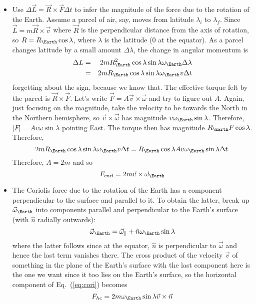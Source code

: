 \documentclass[11pt]{book}
\def\be{\begin{equation}}
\def\ee{\end{equation}}
\def\bea{\begin{eqnarray}}
\def\eea{\end{eqnarray}}
\newcommand{\vs}{\nonumber\\}
\newcommand{\ec}[1]{Eq.~(\ref{eq:#1})}
\newcommand{\eql}[1]{\label{eq:#1}}
\newcommand\bei{\begin{itemize}}
\newcommand\eei{\end{itemize}}
\begin{document}
\bei
\item Use $\Delta \vec L = \vec R\times\vec F \Delta t$ to infer the magnitude of the force due to the rotation of the Earth. Assume a parcel of air, say, moves from latitude $\lambda_i$ to $\lambda_f$. Since $\vec L = m\vec R\times  \vec v$ where $\vec R$ is the perpendicular distance from the axis of rotation, so $R=R_\Earth\cos\lambda$, where $\lambda$ is the latitude ($0$ at the equator). %
As a parcel changes latitude by a small amount $\Delta\lambda$, the change in angular momentum is
\bea
\Delta L &=& 2mR_\Earth^2\cos\lambda\sin\lambda\omega_\Earth \Delta\lambda\vs
&=&
2mR_\Earth\cos\lambda\sin\lambda\omega_\Earth v \Delta t
\eea
forgetting about the sign, because we know that. 
The effective torque felt by the parcel is $\vec R\times\vec F$. Let's write $\vec F = A \vec v\times\vec\omega$ and try to figure out $A$. Again, just focusing on the magnitude, 
take the velocity to be towards the North in the Northern hemisphere, so $\vec v\times\vec\omega$ has magnitude $v\omega_\Earth\sin\lambda$. Therefore, $|F|=Av\omega\sin\lambda$ pointing East. The torque then has magnitude $R_\Earth F\cos\lambda$. Therefore,
\be
2mR_\Earth\cos\lambda\sin\lambda\omega_\Earth v \Delta t = R_\Earth \cos\lambda Av\omega_\Earth\sin\lambda\Delta t
.\ee
Therefore, $A=2m$ and so
\be
F_{\rm cori} = 2m\vec v\times\vec\omega_\Earth\eql{cori}\ee
\item The Coriolis force due to the rotation of the Earth has a component perpendicular to the surface and parallel to it. 
To obtain the latter, break up $\vec\omega_\Earth$ into components parallel and perpendicular to the Earth's surface (with $\hat n$ radially outwards):
\be
\vec\omega_\Earth = \vec\omega_{\parallel} + \hat n \omega_\Earth\sin\lambda\ee
where the latter follows since at the equator, $\hat n$ is perpendicular to $\vec\omega$ and hence the last term vanishes there. The cross product of the velocity $\vec v$ of something in the plane of the Earth's surface with the last component here is the one we want since it too lies on the Earth's surface, so the horizontal component of \ec{cori} becomes
\be F_{hc} = 2m\omega_\Earth\sin\lambda \vec v\times\vec n\ee
\eei
\end{document}

